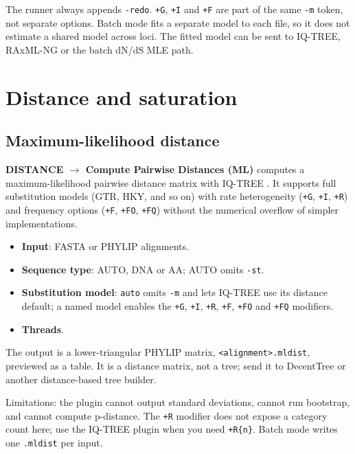\documentclass[10pt]{report}
\begin{document}
The runner always appends \texttt{-redo}. \texttt{+G}, \texttt{+I} and
\texttt{+F} are part of the same \texttt{-m} token, not separate options.
Batch mode fits a separate model to each file, so it does not estimate a
shared model across loci. The fitted model can be sent to IQ-TREE, RAxML-NG or
the batch dN/dS MLE path.

\chapter{Distance and saturation}

\section{Maximum-likelihood distance}

\textbf{DISTANCE $\rightarrow$ Compute Pairwise Distances (ML)} computes a
maximum-likelihood pairwise distance matrix with IQ-TREE \cite{iqtree3}. It supports full
substitution models (GTR, HKY, and so on) with rate heterogeneity
(\texttt{+G}, \texttt{+I}, \texttt{+R}) and frequency options
(\texttt{+F}, \texttt{+FO}, \texttt{+FQ}) without the numerical overflow of
simpler implementations.

\begin{itemize}
  \item \textbf{Input}: FASTA or PHYLIP alignments.
  \item \textbf{Sequence type}: AUTO, DNA or AA; AUTO omits \texttt{-st}.
  \item \textbf{Substitution model}: \texttt{auto} omits \texttt{-m} and lets
        IQ-TREE use its distance default; a named model enables the
        \texttt{+G}, \texttt{+I}, \texttt{+R}, \texttt{+F}, \texttt{+FO} and
        \texttt{+FQ} modifiers.
  \item \textbf{Threads}.
\end{itemize}

The output is a lower-triangular PHYLIP matrix,
\texttt{<alignment>.mldist}, previewed as a table. It is a distance matrix,
not a tree; send it to DecentTree or another distance-based tree builder.

Limitations: the plugin cannot output standard deviations, cannot run
bootstrap, and cannot compute p-distance. The \texttt{+R} modifier does not
expose a category count here; use the IQ-TREE plugin when you need
\texttt{+R\{n\}}. Batch mode writes one \texttt{.mldist} per input.
\end{document}
